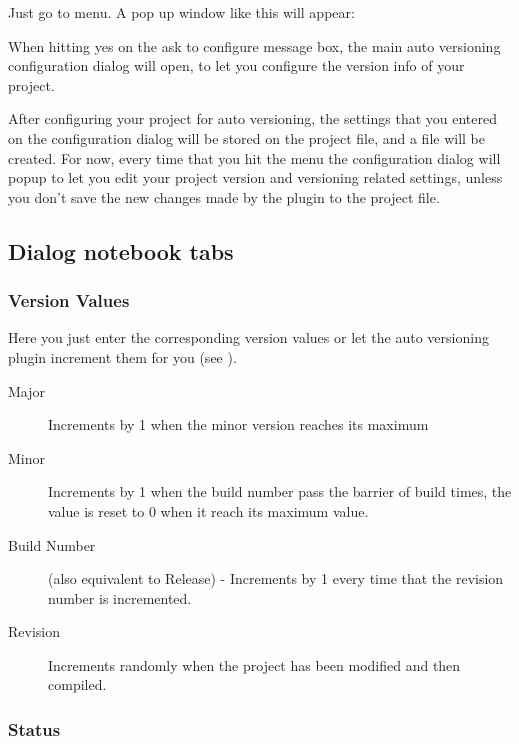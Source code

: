 Just go to  menu. A pop up window like this will appear:


When hitting yes on the ask to configure message box, the main auto versioning configuration dialog will open, to let you configure the version info of your project.

After configuring your project for auto versioning, the settings that you entered on the configuration dialog will be stored on the project file, and a  file will be created. For now, every time that you hit the  menu the configuration dialog will popup to let you edit your project version and versioning related settings, unless you don't save the new changes made by the plugin to the project file.

\subsection{Dialog notebook tabs}
\subsubsection{Version Values}

Here you just enter the corresponding version values or let the auto versioning plugin increment them for you (see ).

\begin{description}
\item[Major] Increments by 1 when the minor version reaches its maximum
\item[Minor] Increments by 1 when the build number pass the barrier of build times, the value is reset to 0 when it reach its maximum value.
\item[Build Number] (also equivalent to Release) - Increments by 1 every time that the revision number is incremented.
\item[Revision] Increments randomly when the project has been modified and then compiled.
\end{description}


\subsubsection{Status}

